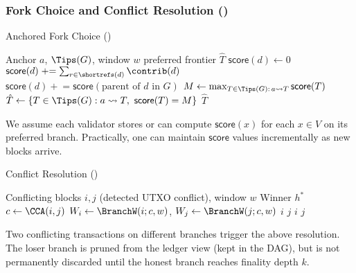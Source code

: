 \subsubsection{Fork Choice and Conflict Resolution (\ProjBase)}
\begin{algorithm}[htbp!]
\caption{Anchored Fork Choice (\ProjBase)}
\label{alg:fork-choice}
\begin{algorithmic}[1]
\Require Anchor $a$, $\Tips(G)$, window $w$
\Ensure preferred frontier $\hat{T}$
  \State $\mathsf{score}(d) \gets 0$
\EndFor
{}
  \State $\mathsf{score}(d) \mathrel{+}= \sum_{r\in \shortrefs(d)} \contrib(d)$ 
  \State $\mathsf{score}(d) \mathrel{+}= \mathsf{score}(\text{parent of }d\text{ in }G)$ 
\EndFor
\State $M \gets \max_{T\in \Tips(G):\,a\leadsto T} \mathsf{score}(T)$
\State $\hat{T} \gets \{ T\in \Tips(G) : a\leadsto T,\ \mathsf{score}(T) = M \}$
\State \Return $\hat{T}$
\end{algorithmic}
\end{algorithm}

\begin{remark}
We assume each validator stores or can compute $\mathsf{score}(x)$ for each $x\in V$ on its preferred branch. Practically, one can maintain $\mathsf{score}$ values incrementally as new blocks arrive.
\end{remark}

\begin{algorithm}[htbp!]
\caption{Conflict Resolution (\ProjBase)}
\label{alg:cca-resolve}
\begin{algorithmic}[1]
\Require Conflicting blocks $i,j$ (detected UTXO conflict), window $w$
\Ensure Winner $h^*$
\State $c \gets \CCA(i,j)$
\State $W_i\gets\BranchW(i;c,w)$, \quad $W_j\gets\BranchW(j;c,w)$
 \Return $i$
 \Return $j$
\Else 
       \Return $i$
      \Else \Return $j$ 
      \EndIf
\EndIf
\end{algorithmic}
\end{algorithm}

\begin{remark}
Two conflicting transactions on different branches trigger the above resolution. The loser branch is pruned from the ledger view (kept in the DAG), but is not permanently discarded until the honest branch reaches finality depth $k$.
\end{remark}

